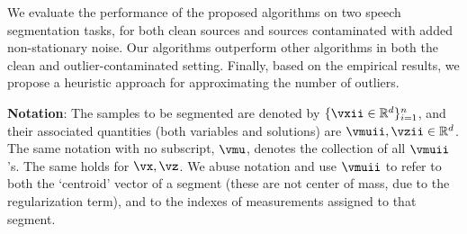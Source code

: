We evaluate the
performance of the proposed algorithms on %
two speech segmentation tasks,
for both clean sources and sources
contaminated with added non-stationary noise. %
Our algorithms outperform other algorithms in both the clean and outlier-contaminated setting.
Finally, based on the empirical results, we propose a heuristic approach for approximating the number of outliers.

{\bf Notation}: The samples to be segmented are
denoted by $\{\vxii\in\mathbb{R}^d\}_{i=1}^n$, and their associated
quantities (both variables and solutions) are
$\vmuii,\vzii\in\mathbb{R}^d$. The same notation with no subscript,
$\vmu$, denotes the collection of all $\vmuii$'s.
The same holds for $\vx,\vz$. We abuse notation and
use $\vmuii$ to refer to both the `centroid' vector of a segment (these
are not center of mass, due to the regularization term), and to the
indexes of measurements assigned to that segment.
